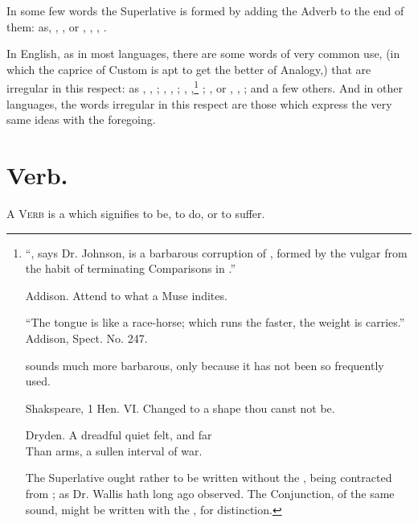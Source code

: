 In some few words the Superlative is formed by adding the Adverb
 to the end of them: as, , , or
, , , .

In English, as in most languages, there are some words of very common
use, (in which the caprice of Custom is apt to get the better of
Analogy,) that are irregular in this respect: as , ,
; , , ; ,
,\footnote{``, says Dr. Johnson, is a barbarous
  corruption of , formed by the vulgar from the habit of
  terminating Comparisons in .''

  \begin{aquote}{Addison.}
    Attend to what a  Muse indites.
  \end{aquote}

  ``The tongue is like a race-horse; which runs the faster, the
   weight is carries.'' Addison, Spect. No. 247.

   sounds much more barbarous, only because it has not been
  so frequently used.

  \begin{aquote}{Shakspeare, 1 Hen. VI.}
    Changed to a  shape thou canst not be.
  \end{aquote}

  \begin{aquote}{Dryden.}
    A dreadful quiet felt, and  far\\
    Than arms, a sullen interval of war.
  \end{aquote}

  The Superlative  ought rather to be written without the
  , being contracted from ; as Dr. Wallis hath long
  ago observed. The Conjunction, of the same sound, might be written
  with the , for distinction.} ; , or
, , ; and a few others. And in other
languages, the words irregular in this respect are those which express
the very same ideas with the foregoing.

\section{Verb.}

\textsc{A Verb} is a  which signifies to be, to do, or to
suffer.

